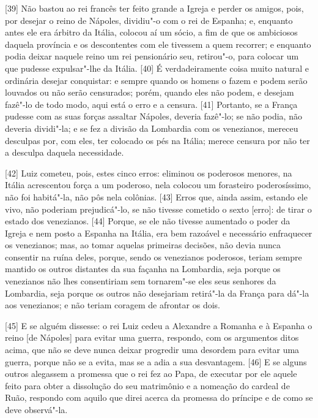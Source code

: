 {[}39{]} Não bastou ao rei francês ter feito grande a Igreja e perder os
amigos, pois, por desejar o reino de Nápoles, dividiu"-o com o rei de
Espanha; e, enquanto antes ele era árbitro da Itália, colocou aí um
sócio, a fim de que os ambiciosos daquela província e os descontentes
com ele tivessem a quem recorrer; e enquanto podia deixar naquele reino
um rei pensionário seu, retirou"-o, para colocar um que pudesse
expulsar"-lhe da Itália. {[}40{]} É verdadeiramente coisa muito natural e
ordinária desejar conquistar: e sempre quando os homens o fazem e podem
serão louvados ou não serão censurados; porém, quando eles não podem, e
desejam fazê"-lo de todo modo, aqui está o erro e a censura. {[}41{]}
Portanto, se a França pudesse com as suas forças assaltar Nápoles,
deveria fazê"-lo; se não podia, não deveria dividi"-la; e se fez a divisão
da Lombardia com os venezianos, mereceu desculpas por, com eles, ter
colocado os pés na Itália; merece censura por não ter a desculpa daquela
necessidade.

{[}42{]} Luiz cometeu, pois, estes cinco erros: eliminou os poderosos
menores, na Itália acrescentou força a um poderoso, nela colocou um
forasteiro poderosíssimo, não foi habitá"-la, não pôs nela colônias.
{[}43{]} Erros que, ainda assim, estando ele vivo, não poderiam
prejudicá"-lo, se não tivesse cometido o sexto {[}erro{]}: de tirar o
estado dos venezianos. {[}44{]} Porque, se ele não tivesse aumentado o
poder da Igreja e nem posto a Espanha na Itália, era bem razoável e
necessário enfraquecer os venezianos; mas, ao tomar aquelas primeiras
decisões, não devia nunca consentir na ruína deles, porque, sendo os
venezianos poderosos, teriam sempre mantido os outros distantes da sua
façanha na Lombardia, seja porque os venezianos não lhes consentiriam
sem tornarem"-se eles seus senhores da Lombardia, seja porque os outros
não desejariam retirá"-la da França para dá"-la aos venezianos; e não
teriam coragem de afrontar os dois.

{[}45{]} E se alguém dissesse: o rei Luiz cedeu a Alexandre a Romanha e
à Espanha o reino {[}de Nápoles{]} para evitar uma guerra, respondo, com
os argumentos ditos acima, que não se deve nunca deixar progredir uma
desordem para evitar uma guerra, porque não se a evita, mas se a adia a
sua desvantagem. {[}46{]} E se alguns outros alegassem a promessa que o
rei fez ao Papa, de executar por ele aquele feito para obter a
dissolução do seu matrimônio e a nomeação do cardeal de Ruão, respondo
com aquilo que direi acerca da promessa do príncipe e de como se deve
observá"-la.

